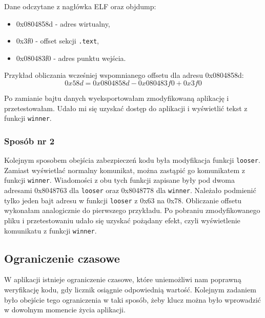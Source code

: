 \documentclass[12pt,a4paper,titlepage]{article}
\begin{document}
\noindent Dane odczytane z nagłówka ELF oraz objdump:
\begin{itemize}
    \item 0x0804858d - adres wirtualny,
    \item 0x3f0 - offset sekcji \texttt{.text},
    \item 0x080483f0 - adres punktu wejścia.
\end{itemize}

\noindent Przykład obliczania wcześniej wspomnianego offsetu dla adresu 0x0804858d:
\begin{equation*}
    0x58d = 0x0804858d - 0x080483f0 + 0x3f0
\end{equation*}

\noindent Po zamianie bajtu danych wyeksportowałam zmodyfikowaną aplikację i przetestowałam. Udało mi się uzyskać dostęp do aplikacji i wyświetlić tekst z funkcji \texttt{winner}.

\subsubsection{Sposób nr 2}
Kolejnym sposobem obejścia zabezpieczeń kodu była modyfikacja funkcji \texttt{looser}. Zamiast wyświetlać normalny komunikat, można zastąpić go komunikatem z funkcji \texttt{winner}. Wiadomości z obu tych funkcji zapisane były pod dwoma adresami 0x8048763 dla \texttt{looser} oraz 0x8048778 dla \texttt{winner}. Należało podmienić tylko jeden bajt adresu w funkcji \texttt{looser} z 0x63 na 0x78. Obliczanie offsetu wykonałam analogicznie do pierwszego przykładu. Po pobraniu zmodyfikowanego pliku i przetestowaniu udało się uzyskać pożądany efekt, czyli wyświetlenie komunikatu z funkcji \texttt{winner}. 

\subsection{Ograniczenie czasowe}
W aplikacji istnieje ograniczenie czasowe, które uniemożliwi nam poprawną weryfikację kodu, gdy licznik osiągnie odpowiednią wartość. Kolejnym zadaniem było obejście tego ograniczenia w taki sposób, żeby klucz można było wprowadzić w dowolnym momencie życia aplikacji.
\end{document}
